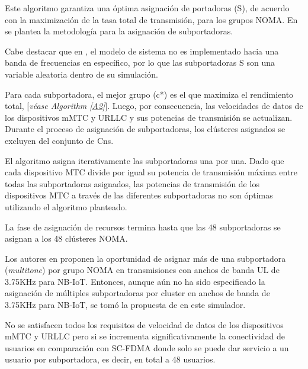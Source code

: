 Este algoritmo garantiza una óptima asignación de portadoras (S), de acuerdo con la maximización de la tasa total de transmisión, para los grupos NOMA. En \parencite{Shahini2019} se plantea la metodología para la asignación de subportadoras. \newline

Cabe destacar que en \parencite{Shahini2019}, el modelo de sistema no es implementado hacia una banda de frecuencias en específico, por lo que las subportadoras S son una variable aleatoria dentro de su simulación.\newline

Para cada subportadora, el mejor grupo (c*) es el que maximiza el rendimiento total, [\textit{véase Algorithm \ref{A2}}]. Luego, por consecuencia, las velocidades de datos de los dispositivos mMTC y URLLC y sus potencias de transmisión se actualizan. Durante el proceso de asignación de subportadoras, los clústeres asignados se excluyen del conjunto de Cns. \newline

El algoritmo asigna iterativamente las subportadoras una por una. Dado que cada dispositivo MTC divide por igual su potencia de transmisión máxima entre todas las subportadoras asignados, las potencias de transmisión de los dispositivos MTC a través de las diferentes subportadoras no son óptimas utilizando el algoritmo planteado. \newline

La fase de asignación de recursos termina hasta que las 48 subportadoras se asignan a los 48 clústeres NOMA. \newline

Los autores en \parencite{Shahini2019} proponen la oportunidad de asignar más de una subportadora (\textit{multitone}) por grupo NOMA en transmisiones con anchos de banda UL de 3.75KHz para NB-IoT. Entonces, aunque aún no ha sido especificado la asignación de múltiples subportadoras por cluster en anchos de banda de 3.75KHz para NB-IoT, se tomó la propuesta de \parencite{Shahini2019} en este simulador. \newline

No se satisfacen todos los requisitos de velocidad de datos de los dispositivos mMTC y URLLC pero si se incrementa significativamente la conectividad de usuarios en comparación con SC-FDMA donde solo se puede dar servicio a un usuario por subportadora, es decir, en total a 48 usuarios.\newline


